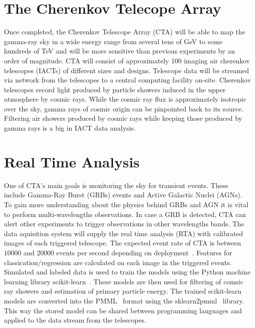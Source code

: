 \documentclass[11pt,twoside]{article}
\begin{document}
\section{The Cherenkov Telecope Array}
Once completed, the  Cherenkov Telescope Array (CTA)  will be able to map the gamma-ray sky
in a wide energy range from several tens of GeV to some hundreds of TeV and will be more sensitive
than previous experiments by an order of magnitude.
CTA will consist of approximately 100 imaging air cherenkov telescopes (IACTs) of different sizes and designs.
Telescope data will be streamed via network from the telescopes to a central computing facility
on-site.
Cherenkov telescopes record light produced by particle showers induced in the upper atmosphere by cosmic rays.
While the cosmic ray flux is approximately isotropic over the sky, gamma rays of cosmic origin can be pinpointed back to its source.
Filtering air showers produced by cosmic rays while keeping those produced by gamma rays is a big in IACT data analysis.



\section{Real Time Analysis}

One of CTA's main goals is monitoring the sky for transient events. These include Gamma-Ray Burst (GRBs) events and
Active Galactic Nuclei (AGNs).
To gain more understanding about the physics behind GRBs and AGN it is vital to perform multi-wavelengths observations.
In case a GRB is detected,  CTA can alert other experiments to trigger observations in other wavelengths bands.
The data aquisition system will supply the real time analysis (RTA) with calibrated images of each triggered telescope.
The expected event rate of CTA is between $10000$ and $20000$ events per second depending on deployment~\citep{trigger}.
Features for classication/regression are calculated on each image in the triggered events.
Simulated and labeled data is used to train the models using the Python machine learning library scikit-learn~\citep{sklearn}.
These models are then used for filtering of comsic ray showers and estimation of primary particle energy.
The trained scikit-learn models are converted into the PMML~\citep{pmml} format using the sklearn2pmml~\citep{sklearn2pmml} library.
This way the stored model can be shared between programming languages and applied to the data stream from the telescopes.

\end{document}
